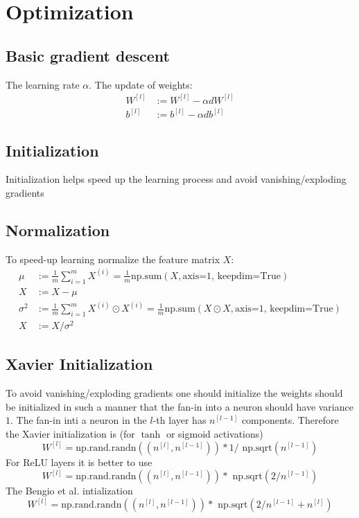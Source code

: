 \documentclass[10pt,a4paper]{article}
\begin{document}
 
\section{Optimization}

 
 \subsection{Basic gradient descent}

The learning rate $\alpha$.  
The update of weights:
\begin{align*}
W^{[l]}&:= W^{[l]} - \alpha  dW^{[l]}\\
b^{[l]}&:= b^{[l]} - \alpha  db^{[l]}
\end{align*}

\subsection{Initialization}
Initialization helps speed up the learning process and avoid vanishing/exploding gradients
\subsection{Normalization}
To speed-up learning normalize the feature matrix $X$:
\begin{align*}
\mu &:= \frac{1}{m}\sum_{i=1}^m  X^{(i)} =  \frac{1}{m}\text{np.sum}(X, \text{axis=1, keepdim=True})\\
X &:= X - \mu \\
\sigma^2 &:= \frac{1}{m}\sum_{i=1}^m  X^{(i)}\odot X^{(i)} =  \frac{1}{m}  \text{np.sum}(X\odot X, \text{axis=1, keepdim=True})\\
X &:= X/\sigma^2
\end{align*}
\subsection{Xavier Initialization}
To avoid vanishing/exploding gradients one should initialize the weights should be initialized in such a manner that the fan-in
into a neuron should have variance $1$. The fan-in inti a neuron in the $l$-th layer has $n^{[l-1]}$ components. 
Therefore the Xavier initialization is (for $\tanh$ or sigmoid activations)
\[ W^[l] = \text{np.rand.randn}((n^{[l]}, n^{[l-1]} )) * 1 /  \text{ np.sqrt} (n^{[l-1]}) \]
For  ReLU layers it is better to use 
\[ W^[l] = \text{np.rand.randn}((n^{[l]}, n^{[l-1]} )) *\text{ np.sqrt} ( 2 /  n^{[l-1]}) \]
The Bengio et al. intialization 
\[ W^[l] = \text{np.rand.randn}((n^{[l]}, n^{[l-1]} )) *  \text{ np.sqrt} (2 / n^{[l-1]} + n^{[l]}) \]
\end{document}
